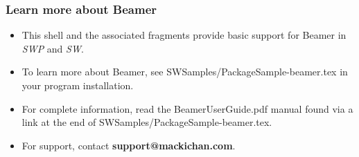\documentclass[notes=show]{beamer}%
\begin{document}
\begin{frame}%
%

\frametitle{Learn more about Beamer}%


\begin{itemize}
\item This shell and the associated fragments provide basic support for Beamer
in \textsl{SWP }and \textsl{SW}.

\item To learn more about Beamer, see SWSamples/PackageSample-beamer.tex in
your program installation.

\item For complete information, read the BeamerUserGuide.pdf manual found via
a link at the end of SWSamples/PackageSample-beamer.tex.

\item For support, contact \textbf{support@mackichan.com}.
\end{itemize}%

\end{frame}%
\end{document}

